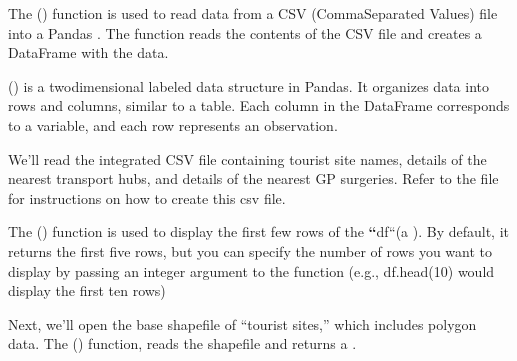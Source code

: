 \documentclass[letterpaper,10pt,english]{sphinxmanual}
\begin{document}
\sphinxAtStartPar
The  () function is used to read data from a CSV (Comma\sphinxhyphen{}Separated Values) file into a Pandas . The function reads the contents of the CSV file and creates a DataFrame with the data.

\sphinxAtStartPar
{} () is a two\sphinxhyphen{}dimensional labeled data structure in Pandas. It organizes data into rows and columns, similar to a table. Each column in the DataFrame corresponds to a variable, and each row represents an observation.

\sphinxAtStartPar
We’ll read the integrated CSV file containing tourist site names, details of the nearest transport hubs, and details of the nearest GP surgeries. Refer to the  file for instructions on how to create this csv file.

\begin{sphinxVerbatim}[commandchars=\\\{\}]
  
\end{sphinxVerbatim}

\sphinxAtStartPar
The  () function is used to display the first few rows of the {\color{red}\bfseries{}``}df``(a ). By default, it returns the first five rows, but you can specify the number of rows you want to display by passing an integer argument to the function (e.g., df.head(10) would display the first ten rows)

\begin{sphinxVerbatim}[commandchars=\\\{\}]
\end{sphinxVerbatim}

\sphinxAtStartPar
Next, we’ll open the base shapefile of “tourist sites,” which includes polygon data.
The  () function, reads the shapefile and returns a .
\end{document}
